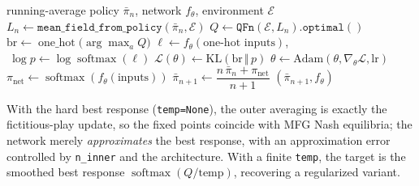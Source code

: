 \documentclass[11pt,a4paper]{article}
\begin{document}
\begin{algorithm}[H]
\caption{NeuralPolicyMLP: one outer iteration}\label{alg:npmlp}
\begin{algorithmic}[1]
\Require running-average policy $\bar{\pi}_n$, network $f_\theta$, environment $\mathcal{E}$
\State $L_n \gets \texttt{mean\_field\_from\_policy}(\bar{\pi}_n, \mathcal{E})$
\State $Q \gets \texttt{QFn}(\mathcal{E}, L_n).\texttt{optimal}()$
\State $\mathrm{br} \gets \operatorname{one\_hot}\bigl(\arg\max_a Q\bigr)$ 
 
  \State $\ell \gets f_\theta(\text{one-hot inputs})$, $\ \log p \gets \log\operatorname{softmax}(\ell)$
  \State $\mathcal{L}(\theta) \gets \mathrm{KL}(\mathrm{br} \,\Vert\, p)$
  \State $\theta \gets \mathrm{Adam}(\theta, \nabla_\theta \mathcal{L}, \mathrm{lr})$
\EndFor
\State $\pi_{\mathrm{net}} \gets \operatorname{softmax}(f_\theta(\text{inputs}))$ 
\State $\bar{\pi}_{n+1} \gets \dfrac{n\, \bar{\pi}_n + \pi_{\mathrm{net}}}{n + 1}$ 
\State \Return $(\bar{\pi}_{n+1}, f_\theta)$
\end{algorithmic}
\end{algorithm}

With the hard best response (\texttt{temp=None}), the outer averaging is
exactly the fictitious-play update, so the fixed points coincide with MFG Nash
equilibria; the network merely \emph{approximates} the best response, with
an approximation error controlled by \texttt{n\_inner} and the architecture.
With a finite \texttt{temp}, the target is the smoothed best response
$\operatorname{softmax}(Q/\text{temp})$, recovering a regularized variant.
\end{document}
